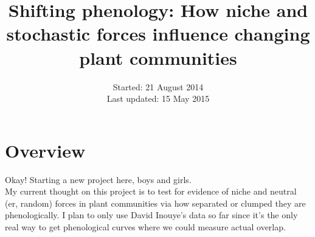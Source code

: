 \documentclass[11pt,a4paper]{article}
\begin{document}

\renewcommand{\refname}{\CHead{}}

\title{Shifting phenology: How niche and stochastic forces influence changing plant communities} 


\date{Started: 21 August 2014\\ Last updated: 15 May 2015}
\author{}
\maketitle

\section{Overview}
Okay! Starting a new project here, boys and girls.\\

My current thought on this project is to test for evidence of niche and neutral (er, random) forces in plant communities via how separated or clumped they are phenologically. I plan to only use David Inouye's data so far since it's the only real way to get phenological curves where we could measure actual overlap.\\
\end{document}
